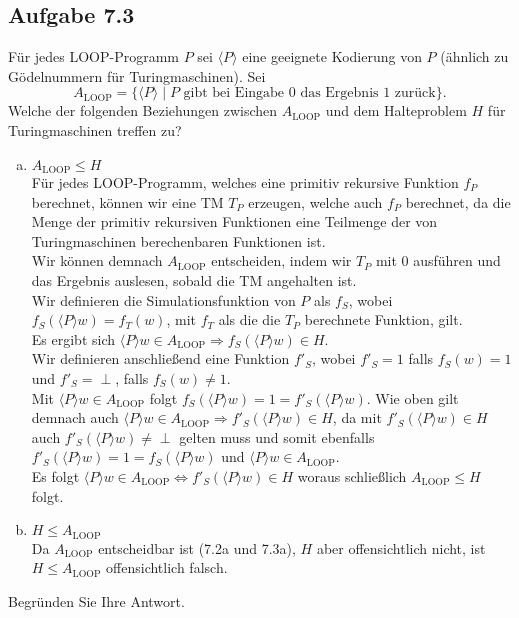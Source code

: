 \subsection*{Aufgabe 7.3}
Für jedes LOOP-Programm $P$ sei $\langle P \rangle$ eine geeignete Kodierung von $P$ (ähnlich zu Gödelnummern für Turingmaschinen). Sei
$$A_{ \text{LOOP} }= \{\langle P \rangle \mid P \text{ gibt bei Eingabe 0 das Ergebnis 1 zurück}\}.$$
Welche der folgenden Beziehungen zwischen $A_{\text{LOOP}}$ und dem Halteproblem $H$ für Turingmaschinen treffen zu?
\begin{enumerate}[(a)]
	\item $A_{\text{LOOP}} \leq H$\\
	Für jedes LOOP-Programm, welches eine primitiv rekursive Funktion $f_P$ berechnet, können wir eine TM $T_P$ erzeugen, welche auch $f_P$ berechnet, da die Menge der primitiv rekursiven Funktionen eine Teilmenge der von Turingmaschinen berechenbaren Funktionen ist.\\
	Wir können demnach $A_\text{LOOP}$ entscheiden, indem wir $T_P$ mit 0 ausführen und das Ergebnis auslesen, sobald die TM angehalten ist.\\
	Wir definieren die Simulationsfunktion von $P$ als $f_S$, wobei $f_S(\langle P \rangle w) = f_T (w)$, mit $f_T$ als die die $T_P$ berechnete Funktion, gilt.\\
	Es ergibt sich $\langle P \rangle w \in A_\text{LOOP} \Rightarrow f_S(\langle P \rangle w) \in H$.\\
	Wir definieren anschließend eine Funktion $f'_S$, wobei $f'_S = 1$ falls $f_S(w)=1$ und $f'_S = \perp$, falls $f_S(w) \neq 1$.\\
	Mit $\langle P \rangle w \in A_\text{LOOP}$ folgt $f_S(\langle P \rangle w) = 1 = f'_S(\langle P \rangle w)$. Wie oben gilt demnach auch $\langle P \rangle w \in A_\text{LOOP} \Rightarrow f'_S(\langle P \rangle w) \in H$, da
	mit $f'_S(\langle P \rangle w) \in H$ auch $f'_S(\langle P \rangle w) \neq \perp$ gelten muss und somit ebenfalls $f'_S(\langle P \rangle w) = 1 = f_S(\langle P \rangle w)$ und $ \langle P \rangle w \in A_\text{LOOP}$.\\
	Es folgt $\langle P \rangle w \in A_\text{LOOP} \Leftrightarrow f'_S (\langle P \rangle w ) \in H$ woraus schließlich $A_\text{LOOP} \le H$ folgt.\\
	\item $H \leq A_{\text{LOOP}}$\\
	Da $A_\text{LOOP}$ entscheidbar ist (7.2a und 7.3a), $H$ aber offensichtlich nicht, ist $H \le A_\text{LOOP}$ offensichtlich falsch.
\end{enumerate}
Begründen Sie Ihre Antwort.
